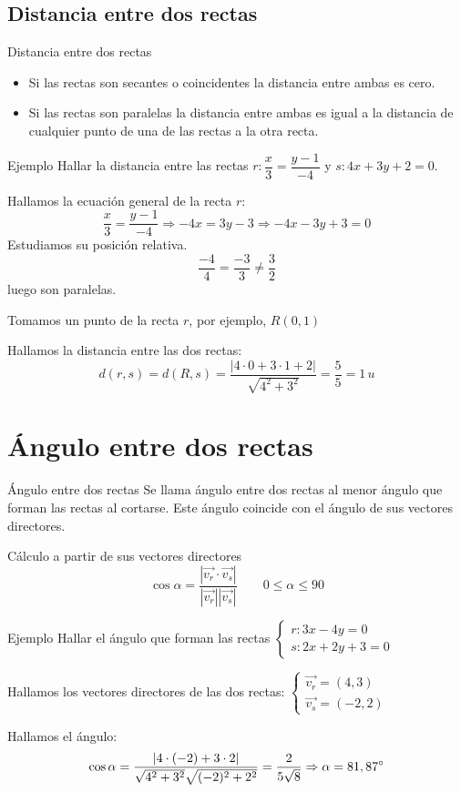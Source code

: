 \documentclass[8pt]{beamer}
\begin{document}
\subsection{Distancia entre dos rectas}
\begin{frame}[t]{Distancia entre dos rectas}

\begin{itemize}[<+->]
\item Si las rectas son secantes o coincidentes la distancia entre ambas es cero.
\item Si las rectas son paralelas la distancia entre ambas es igual a la distancia de cualquier punto de una de las rectas a la otra recta.
\end{itemize}

\pause
\begin{exampleblock}{Ejemplo}
Hallar la distancia entre las rectas $r: \dfrac{x}{3}= \dfrac{y-1}{-4}$ y $s:4x+3y + 2 = 0 $. 
\end{exampleblock}

\pause
Hallamos la ecuación general de la recta $r$:
\[ \dfrac{x}{3}=\dfrac{y-1}{-4} \Rightarrow -4x=3y-3 \Rightarrow -4x-3y+3=0 \]
\pause
Estudiamos su posición relativa.
\[ \dfrac{-4}{4}=\dfrac{-3}{3} \neq \dfrac{3}{2} \]
luego son paralelas.

\pause
Tomamos un punto de la recta $r$, por ejemplo, $R(0,1)$
\pause

Hallamos la distancia entre las dos rectas:
\[ d(r,s)=d(R,s)=\dfrac{|4\cdot 0+3\cdot 1 +2|}{\sqrt{4^2+3^2}}= \dfrac{5}{5}= 1 \, u \]
\end{frame}

\section{Ángulo entre dos rectas}
\begin{frame}[t]{Ángulo entre dos rectas}
Se llama ángulo entre dos rectas al menor ángulo que forman las rectas al cortarse. Este ángulo coincide con el ángulo de sus vectores directores.
\pause
\begin{alertblock}{Cálculo a partir de sus vectores directores}
\[ \cos \alpha = \dfrac{\left| \vec{v_r}\cdot \vec{v_s}\right|}{\left| \vec{v_r}\right|\left|\vec{v_s}\right|} \qquad 0 \leq \alpha \leq 90 \]
\end{alertblock}
\pause
\begin{exampleblock}{Ejemplo}
Hallar el ángulo que forman las rectas $\begin{cases} r: 3x-4y=0 \\ s: 2x+2y+3=0 \end{cases}$
\end{exampleblock}
\pause
Hallamos los vectores directores de las dos rectas: $\begin{cases} \vec{v_r}=(4,3) \\ \vec{v_s}=(-2,2) \end{cases}$
\pause

Hallamos el ángulo:
\pause
\[ \cos \alpha = \dfrac{| 4 \cdot(-2) +3 \cdot 2 |}{\sqrt{4^2+3^2}\sqrt{(-2)^2+2^2}}= \dfrac{2}{5\sqrt{8}} \Rightarrow \alpha = 81,87 {}^\circ \]

\end{frame}
\end{document}
